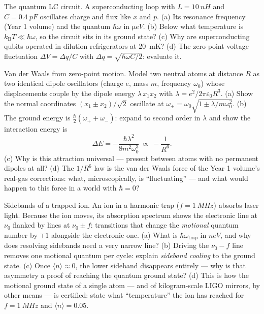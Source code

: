 \begin{exercise}[$\star\star$]\label{exo:b3:harmonic-oscillator:9}
The quantum LC circuit. A superconducting loop with $L =
\qty{10}{nH}$ and $C = \qty{0.4}{pF}$ oscillates charge and flux
like $x$ and $p$. (a) Its resonance frequency (Year 1 volume) and
the quantum $\hbar\omega$ in $\unit{\micro eV}$. (b) Below what
temperature is $k_{\text{B}}T \ll \hbar\omega$, so the circuit sits
in its ground state? (c) Why are superconducting qubits operated in
dilution refrigerators at \qty{20}{mK}? (d) The zero-point voltage
fluctuation $\Delta V = \Delta q/C$ with $\Delta q =
\sqrt{\hbar\omega C/2}$: evaluate it.
\end{exercise}

\begin{exercise}[$\star\star\star$]\label{exo:b3:harmonic-oscillator:10}
Van der Waals from zero-point motion. Model two neutral atoms at
distance $R$ as two identical dipole oscillators (charge $e$, mass
$m$, frequency $\omega_0$) whose displacements couple by the dipole
energy $\lambda\,x_1x_2$ with $\lambda = e^2/2\pi\varepsilon_0R^3$.
(a) Show the normal coordinates $(x_1 \pm x_2)/\sqrt2$ oscillate at
$\omega_\pm = \omega_0\sqrt{1 \pm \lambda/m\omega_0^2}$. (b) The
ground energy is $\tfrac\hbar2(\omega_+ + \omega_-)$: expand to
second order in $\lambda$ and show the interaction energy is
\[
\Delta E = -\frac{\hbar\lambda^2}{8m^2\omega_0^3}
\ \propto\ -\frac{1}{R^6} .
\]
(c) Why is this attraction universal --- present between atoms with
no permanent dipoles at all? (d) The $1/R^6$ law is the van der
Waals force of the Year 1 volume's real-gas corrections: what,
microscopically, is ``fluctuating'' --- and what would happen to
this force in a world with $\hbar = 0$?
\end{exercise}

\begin{exercise}[$\star\star\star$]\label{exo:b3:harmonic-oscillator:11}
Sidebands of a trapped ion. An ion in a harmonic trap ($f =
\qty{1}{MHz}$) absorbs laser light. Because the ion moves, its
absorption spectrum shows the electronic line at $\nu_0$ flanked by
lines at $\nu_0 \pm f$: transitions that change the \emph{motional}
quantum number by $\mp1$ alongside the electronic one. (a) What is
$\hbar\omega_{\text{trap}}$ in $\unit{neV}$, and why does resolving
sidebands need a very narrow line? (b) Driving the $\nu_0 - f$ line
removes one motional quantum per cycle: explain \emph{sideband
cooling} to the ground state. (c) Once $\langle n\rangle \approx
0$, the lower sideband disappears entirely --- why is that
asymmetry a proof of reaching the quantum ground state? (d) This is
how the motional ground state of a single atom --- and of
kilogram-scale LIGO mirrors, by other means --- is certified: state
what ``temperature'' the ion has reached for $f = \qty{1}{MHz}$ and
$\langle n\rangle = 0.05$.
\end{exercise}


